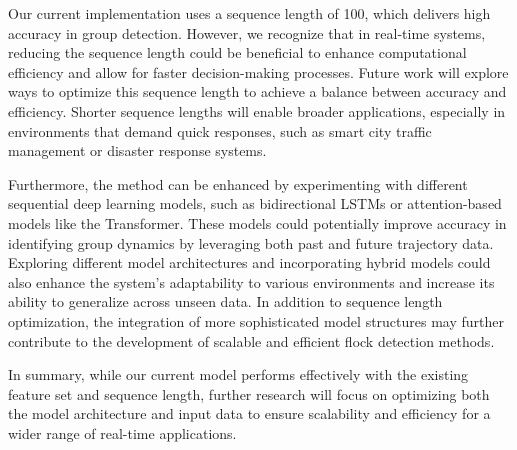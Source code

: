 \documentclass{article}
\begin{document}
Our current implementation uses a sequence length of 100, which delivers high accuracy in group detection. However, we recognize that in real-time systems, reducing the sequence length could be beneficial to enhance computational efficiency and allow for faster decision-making processes. Future work will explore ways to optimize this sequence length to achieve a balance between accuracy and efficiency. Shorter sequence lengths will enable broader applications, especially in environments that demand quick responses, such as smart city traffic management or disaster response systems.

Furthermore, the method can be enhanced by experimenting with different sequential deep learning models, such as bidirectional LSTMs or attention-based models like the Transformer. These models could potentially improve accuracy in identifying group dynamics by leveraging both past and future trajectory data. Exploring different model architectures and incorporating hybrid models could also enhance the system’s adaptability to various environments and increase its ability to generalize across unseen data. In addition to sequence length optimization, the integration of more sophisticated model structures may further contribute to the development of scalable and efficient flock detection methods.

In summary, while our current model performs effectively with the existing feature set and sequence length, further research will focus on optimizing both the model architecture and input data to ensure scalability and efficiency for a wider range of real-time applications.



\end{document}
